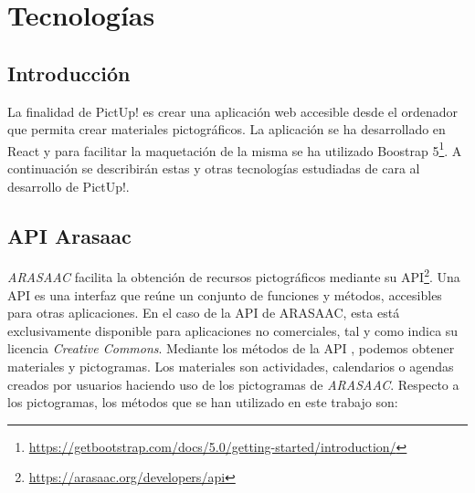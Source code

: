 \chapter{Tecnologías}





\section{Introducción}

La finalidad de PictUp! es crear una aplicación web accesible desde el ordenador que permita crear materiales pictográficos. La aplicación se ha desarrollado en React y para facilitar la maquetación de la misma se ha utilizado Boostrap 5\footnote{\url{https://getbootstrap.com/docs/5.0/getting-started/introduction/}}. 
A continuación se describirán estas y otras tecnologías estudiadas de cara al desarrollo de PictUp!.


\section{API Arasaac}
\label{cap3:sec:apiarasaac}
\textit{ARASAAC} facilita la obtención de recursos pictográficos mediante su API\footnote{\url{https://arasaac.org/developers/api}}. Una API es una interfaz que reúne un conjunto de funciones y métodos, accesibles para otras aplicaciones. En el caso de la API de ARASAAC, esta está exclusivamente disponible para aplicaciones no comerciales, tal y como indica su licencia \textit{Creative Commons}.
Mediante los métodos de la API , podemos obtener materiales y pictogramas. Los materiales son actividades, calendarios o agendas creados por usuarios haciendo uso de los pictogramas de \textit{ARASAAC}. Respecto a los pictogramas, los métodos que se han utilizado en este trabajo son:

